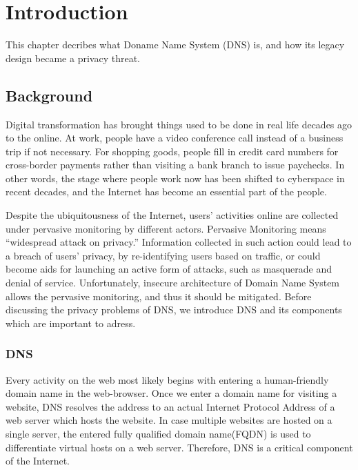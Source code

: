 \documentclass[a4paper,12pt]{article}
\begin{document}
\newpage
{}
\tableofcontents %
\newpage
{}

%
%

\section{Introduction}
This chapter decribes what Doname Name System (DNS) is, and how its legacy design became a privacy threat. 

\subsection{Background}
Digital transformation has brought things used to be done in real life decades ago to the online. At work, people have a video conference call instead of a business trip if not necessary. For shopping goods, people fill in credit card numbers for cross-border payments rather than visiting a bank branch to issue paychecks. In other words, the stage where people work now has been shifted to cyberspace in recent decades, and the Internet has become an essential part of the people.

Despite the ubiquitousness of the Internet, users' activities online are collected under pervasive monitoring by different actors.
Pervasive Monitoring means ``widespread attack on privacy\cite{rfc7258}.'' Information collected in such action could lead to a breach of users’ privacy, by re-identifying users based on traffic\cite{herrmann2010analyzing}, or could become aids for launching an active form of attacks, such as masquerade and denial of service.
Unfortunately, insecure architecture of Domain Name System allows the pervasive monitoring, and thus it should be mitigated. Before discussing the privacy problems of DNS, we introduce DNS and its components which are important to adress.

\subsubsection{DNS}
Every activity on the web most likely begins with entering a human-friendly domain name in the web-browser. Once we enter a domain name for visiting a website, DNS resolves the address to an actual Internet Protocol Address of a web server which hosts the website. In case multiple websites are hosted on a single server, the entered fully qualified domain name(FQDN) is used to differentiate virtual hosts on a web server\cite{virtual24host}. Therefore, DNS is a critical component of the Internet.
\end{document}

